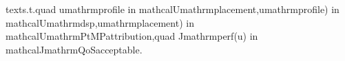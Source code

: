 {}\markdownRendererBackslash{}text\markdownRendererLeftBrace{}s.t.\markdownRendererRightBrace{}\markdownRendererBackslash{}quad\markdownRendererSoftLineBreak
{}\markdownRendererAmpersand{} u\markdownRendererUnderscore{}\markdownRendererLeftBrace{}\markdownRendererBackslash{}mathrm\markdownRendererLeftBrace{}profile\markdownRendererRightBrace{}\markdownRendererRightBrace{} \markdownRendererBackslash{}in \markdownRendererBackslash{}mathcal\markdownRendererLeftBrace{}U\markdownRendererRightBrace{}\markdownRendererLeftBrace{}\markdownRendererBackslash{}mathrm\markdownRendererLeftBrace{}placement\markdownRendererRightBrace{}\markdownRendererRightBrace{},u\markdownRendererUnderscore{}\markdownRendererLeftBrace{}\markdownRendererBackslash{}mathrm\markdownRendererLeftBrace{}profile\markdownRendererRightBrace{}\markdownRendererRightBrace{}) \markdownRendererBackslash{}in \markdownRendererBackslash{}mathcal\markdownRendererLeftBrace{}U\markdownRendererRightBrace{}\markdownRendererLeftBrace{}\markdownRendererBackslash{}mathrm\markdownRendererLeftBrace{}dsp\markdownRendererRightBrace{}\markdownRendererRightBrace{},u\markdownRendererUnderscore{}\markdownRendererLeftBrace{}\markdownRendererBackslash{}mathrm\markdownRendererLeftBrace{}placement\markdownRendererRightBrace{}\markdownRendererRightBrace{}) \markdownRendererBackslash{}in \markdownRendererBackslash{}mathcal\markdownRendererLeftBrace{}U\markdownRendererRightBrace{}\markdownRendererLeftBrace{}\markdownRendererBackslash{}mathrm\markdownRendererLeftBrace{}PtMP\markdownRendererUnderscore{}attribution\markdownRendererRightBrace{}\markdownRendererRightBrace{},\markdownRendererBackslash{}quad J\markdownRendererUnderscore{}\markdownRendererLeftBrace{}\markdownRendererBackslash{}mathrm\markdownRendererLeftBrace{}perf\markdownRendererRightBrace{}\markdownRendererRightBrace{}(u) \markdownRendererBackslash{}in \markdownRendererBackslash{}mathcal\markdownRendererLeftBrace{}J\markdownRendererRightBrace{}\markdownRendererUnderscore{}\markdownRendererLeftBrace{}\markdownRendererBackslash{}mathrm\markdownRendererLeftBrace{}QoS\markdownRendererUnderscore{}acceptable\markdownRendererRightBrace{}\markdownRendererRightBrace{}.\markdownRendererSoftLineBreak
